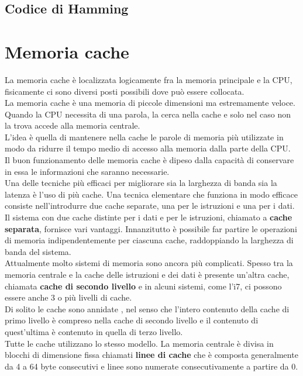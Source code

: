 \documentclass[12pt]{report}
\begin{document}
\subsection{Codice di Hamming}
\section{Memoria cache}
La memoria cache è localizzata logicamente fra la memoria principale e la CPU, fisicamente ci sono diversi posti possibili dove può essere collocata. \\
La memoria cache è una memoria di piccole dimensioni ma estremamente veloce. Quando la CPU necessita di una parola, la cerca nella cache e solo nel caso non la trova accede alla memoria centrale. \\
L'idea è quella di mantenere nella cache le parole di memoria più utilizzate in modo da ridurre il tempo medio di accesso alla memoria dalla parte della CPU. \\
Il buon funzionamento delle memoria cache è dipeso dalla capacità di conservare in essa le informazioni che saranno necessarie. \\
Una delle tecniche più efficaci per migliorare sia la larghezza di banda sia la latenza è l'uso di più cache. Una tecnica elementare che funziona in modo efficace consiste nell'introdurre due cache separate, una per le istruzioni e una per i dati. \\
Il sistema con due cache distinte per i dati e per le istruzioni, chiamato a \textbf{cache separata}, fornisce vari vantaggi. Innanzitutto è possibile far partire le operazioni di memoria indipendentemente per ciascuna cache, raddoppiando la larghezza di banda del sistema. \\
Attualmente molto sistemi di memoria sono ancora più complicati. Spesso tra la memoria centrale e la cache delle istruzioni e dei dati è presente un'altra cache, chiamata \textbf{cache di secondo livello} e in alcuni sistemi, come l'i7, ci possono essere anche 3 o più livelli di cache. \\
Di solito le cache sono annidate , nel senso che l'intero contenuto della cache di primo livello è compreso nella cache di secondo livello e il contenuto di quest'ultima è contenuto in quella di terzo livello. \\
Tutte le cache utilizzano lo stesso modello. La memoria centrale è divisa in blocchi di dimensione fissa chiamati \textbf{linee di cache} che è composta generalmente da 4 a 64 byte consecutivi e linee sono numerate consecutivamente a partire da 0. \\
\end{document}
